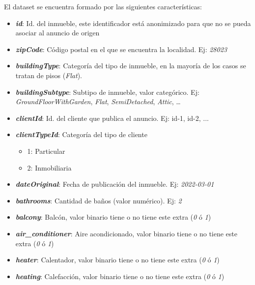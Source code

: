 El dataset se encuentra formado por las siguientes características:
\begin{itemize}

	\item \textit{\textbf{id}}: Id. del inmueble, este identificador está anonimizado para que no se pueda asociar al anuncio de origen

	\item \textit{\textbf{zipCode}}: Código postal en el que se encuentra la localidad. Ej: \textit{28023}

	\item \textit{\textbf{buildingType}}: Categoría del tipo de inmueble, en la mayoría de los casos se tratan de pisos (\textit{Flat}).

	\item \textit{\textbf{buildingSubtype}}: Subtipo de inmueble, valor categórico. Ej: \textit{GroundFloorWithGarden}, \textit{Flat}, \textit{SemiDetached}, \textit{Attic}, \dots

	\item \textit{\textbf{clientId}}: Id. del cliente que publica el anuncio. Ej: id-1, id-2, ... 

	\item \textit{\textbf{clientTypeId}}: Categoría del tipo de cliente
	\begin{itemize}
            \item 1: Particular
            \item 2: Inmobiliaria
      \end{itemize}
	\item \textit{\textbf{dateOriginal}}: Fecha de publicación del inmueble. Ej: \textit{2022-03-01}

	\item \textit{\textbf{bathrooms}}: Cantidad de baños (valor numérico). Ej: \textit{2}

	\item \textit{\textbf{balcony}}: Balcón, valor binario tiene o no tiene este extra (\textit{0} ó \textit{1})

	\item \textit{\textbf{air{\_}conditioner}}: Aire acondicionado, valor binario tiene o no tiene este extra (\textit{0} ó \textit{1})

	\item \textit{\textbf{heater}}: Calentador, valor binario tiene o no tiene este extra (\textit{0} ó \textit{1})

	\item \textit{\textbf{heating}}: Calefacción, valor binario tiene o no tiene este extra (\textit{0} ó \textit{1})


\end{itemize}
